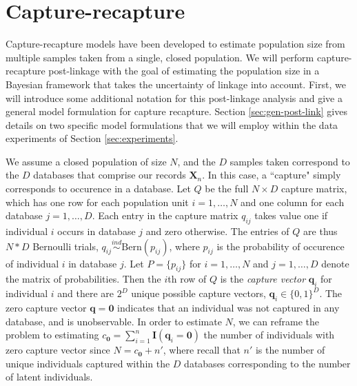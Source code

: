 \documentclass[11pt]{article}
\begin{document}
\section{Capture-recapture}

Capture-recapture models have been developed to estimate population size from multiple samples taken from a single, closed population. We will perform capture-recapture post-linkage with the goal of estimating the population size in a Bayesian framework that takes the uncertainty of linkage into account. First, we will introduce some additional notation for this post-linkage analysis and give a general model formulation for capture recapture. Section \ref{sec:gen-post-link} gives details on two specific model formulations that we will employ within the data experiments of Section \ref{sec:experiments}.

We assume a closed population of size $N$, and the $D$ samples taken correspond to the $D$ databases that comprise our records $\boldsymbol X_n$. In this case, a ``capture" simply corresponds to occurence in a database. Let $Q$ be the full $N \times D$ capture matrix, which has one row for each population unit $i = 1, \dots, N$ and one column for each database $j = 1, \dots, D$. Each entry in the capture matrix $q_{ij}$ takes value one if individual $i$ occurs in database $j$ and zero otherwise. The entries of $Q$ are thus $N*D$ Bernoulli trials, $q_{ij}\stackrel{ind}{\sim} \text{Bern}(p_{ij})$, where $p_{ij}$ is the probability of occurence of individual $i$ in database $j$. Let $P = \{p_{ij}\}$ for $i = 1, \dots, N$ and $j = 1, \dots, D$ denote the matrix of probabilities. Then the $i$th row of $Q$ is the \emph{capture vector} $\boldsymbol q_i$ for individual $i$ and there are $2^D$ unique possible capture vectors, $\boldsymbol q_i \in \{0,1\}^D$. The zero capture vector $\boldsymbol q = \boldsymbol 0$ indicates that an individual was not captured in any database, and is unobservable. In order to estimate $N$, we can reframe the problem to estimating $c_{\boldsymbol 0} = \sum_{i = 1}^n \boldsymbol I(\boldsymbol q_i = \boldsymbol 0)$ the number of individuals with zero capture vector since $N = c_{\boldsymbol 0} + n'$, where recall that $n'$ is the number of unique individuals captured within the $D$ databases corresponding to the number of latent individuals.
\end{document}
